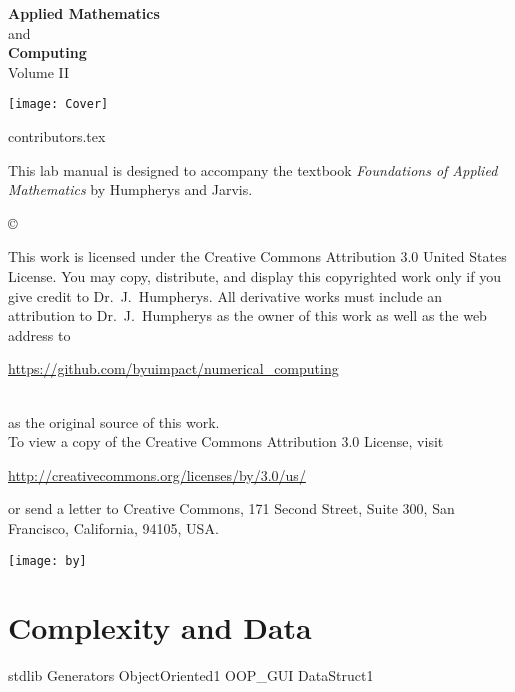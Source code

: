 \documentclass[nociteref]{newsiambook}
\begin{document}
\thispagestyle{empty}
\begin{center}
{\huge \bf Applied Mathematics} \\ and \\ {\huge \bf Computing} \\
\vspace{5mm}
{\Large Volume II}
\vspace{20mm}

\texttt{[image: Cover]}
\end{center}
\frontmatter

{contributors.tex}


\begin{thepreface}
This lab manual is designed to accompany the textbook \emph{Foundations of Applied Mathematics} by Humpherys and Jarvis.

\vfill
\copyright{This work is licensed under the Creative Commons Attribution 3.0 United States
License.  You may copy, distribute, and display this copyrighted work only if you give
credit to Dr.~J.~Humpherys. All derivative works must include an attribution to Dr.~J.~Humpherys as the owner of this work as well as the web address to
\\\centerline{\url{https://github.com/byuimpact/numerical_computing}}\\ as the original source of
this
work.\\To view a copy of the Creative Commons Attribution 3.0 License,
visit\\\centerline{\url{http://creativecommons.org/licenses/by/3.0/us/}} or send a letter to
Creative Commons, 171 Second Street, Suite 300, San Francisco, California, 94105, USA.}

\vfill
\centering\texttt{[image: by]}
\vfill
\end{thepreface}

\setcounter{tocdepth}{1}
\tableofcontents

\mainmatter

\part{Complexity and Data}
{stdlib}
{Generators}
{ObjectOriented1}
{OOP_GUI}
{DataStruct1}
\end{document}
